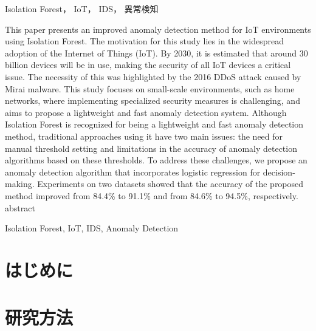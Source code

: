 \documentclass{css}
\begin{document}

\begin{jkeyword}
Isolation Forest， IoT， IDS， 異常検知
\end{jkeyword}

\begin{eabstract}
    This paper presents an improved anomaly detection method for IoT environments using Isolation Forest. The motivation for this study lies in the widespread adoption of the Internet of Things (IoT). By 2030, it is estimated that around 30 billion devices will be in use, making the security of all IoT devices a critical issue. The necessity of this was highlighted by the 2016 DDoS attack caused by Mirai malware. This study focuses on small-scale environments, such as home networks, where implementing specialized security measures is challenging, and aims to propose a lightweight and fast anomaly detection system. Although Isolation Forest is recognized for being a lightweight and fast anomaly detection method, traditional approaches using it have two main issues: the need for manual threshold setting and limitations in the accuracy of anomaly detection algorithms based on these thresholds. To address these challenges, we propose an anomaly detection algorithm that incorporates logistic regression for decision-making. Experiments on two datasets showed that the accuracy of the proposed method improved from 84.4\% to 91.1\% and from 84.6\% to 94.5\%, respectively.
abstract

\end{eabstract}


\begin{ekeyword}
Isolation Forest, IoT, IDS, Anomaly Detection
\end{ekeyword}


\maketitle

\section{はじめに}

\section{研究方法}
\end{document}
